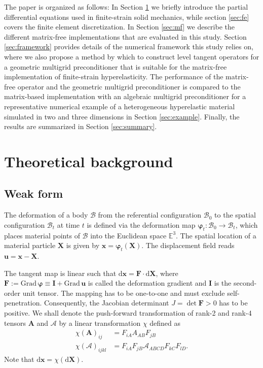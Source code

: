 \documentclass[AMA,STIX1COL]{WileyNJD-v2}
\newcommand*{\gz}[1]{\boldsymbol{#1}}
\newcommand*{\Grad}{\mathrm{Grad}}
\renewcommand*{\d}{\mathrm{d}}
\newcommand*{\mcl}[1]{\mathcal{#1}}
\begin{document}
The paper is organized as follows:
In Section \ref{sec:theory} we briefly introduce the partial differential equations used in finite-strain solid mechanics,
while section \ref{sec:fe} covers the finite element discretization.
In Section \ref{sec:mf} we describe the different matrix-free implementations that are evaluated in this study.
Section \ref{sec:framework} provides details of the numerical framework {\color{red}this study relies on},
where we also propose a method by which to construct level tangent operators for
a geometric multigrid preconditioner that is suitable for the matrix-free implementation of finite-strain hyperelasticity.
%
The performance of the matrix-free operator and the geometric multigrid preconditioner is compared to the matrix-based implementation with an algebraic multigrid preconditioner for a representative numerical example of a heterogeneous hyperelastic material simulated in two and three dimensions in Section \ref{sec:example}.
Finally, the results are summarized in Section \ref{sec:summary}.

\section{Theoretical background}
\label{sec:theory}

\subsection{Weak form}
The deformation of a body $\mcl B$ from the referential configuration $\mcl B_0$ to the spatial configuration $\mcl B_t$ at time $t$
is defined via the deformation map $\gz \varphi_t: \mcl B_0 \rightarrow \mcl B_t$, which places material points of $\mcl B$ into the Euclidean space $\mathbb E^3$.
The spatial location of a material particle $\gz X$ is given by $\gz x = \gz \varphi_t (\gz X)$.
The displacement field reads $\gz u = \gz x - \gz X$.

The tangent map is linear such that
$\d \gz x = \gz F \cdot \d \gz X$,
where $\gz F := \Grad \, \gz \varphi \equiv \gz I + \Grad \, \gz u$ is called the deformation gradient and $\gz I$ is the second-order unit tensor.
The mapping has to be one-to-one and must exclude self-penetration. Consequently, the Jacobian {\color{red}determinant} $J = \det \gz F > 0$ has to be positive.
We shall denote the push-forward transformation of rank-2 and rank-4 tensors $\mathbf{A}$ and $\boldsymbol{\mathcal{A}}$ by a linear transformation $\chi$ defined as
\begin{align}
  \chi\left( \mathbf{A} \right)_{ij}
  &= F_{iA} A_{AB} F_{jB} \\
  \chi\left( \boldsymbol{\mathcal{A}} \right)_{ijkl}
  &= F_{iA} F_{jB} \mathcal{A}_{ABCD} F_{kC} F_{lD}.
\end{align}
Note that $\d \gz x = \chi(\d \gz X)$.
\end{document}
